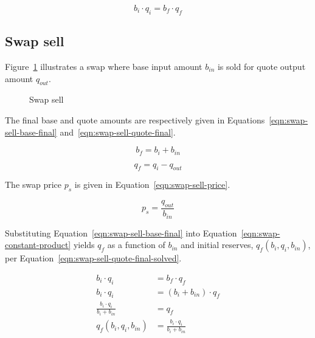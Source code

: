 \documentclass[table, twocolumn]{article}
\begin{document}
\begin{equation}\label{eqn:swap-constant-product}
	b_i \cdot q_i = b_f \cdot q_f
\end{equation}

\subsection{Swap sell}\label{ssec:swap-sell}

Figure~\ref{fig:swap-sell} illustrates a swap where base input amount $b_{in}$ is sold
for quote output amount $q_{out}$.

\begin{figure}[!htb]
	\centering
	
	\caption{Swap sell}\label{fig:swap-sell}
\end{figure}

The final base and quote amounts are respectively given in
Equations~\ref{eqn:swap-sell-base-final} and~\ref{eqn:swap-sell-quote-final}.

\begin{equation}\label{eqn:swap-sell-base-final}
	b_f = b_i + b_{in}
\end{equation}

\begin{equation}\label{eqn:swap-sell-quote-final}
	q_f = q_i - q_{out}
\end{equation}

The swap price $p_s$ is given in Equation~\ref{eqn:swap-sell-price}.

\begin{equation}\label{eqn:swap-sell-price}
	p_s = \frac{q_{out}}{b_{in}}
\end{equation}

Substituting Equation~\ref{eqn:swap-sell-base-final} into
Equation~\ref{eqn:swap-constant-product} yields $q_f$ as a function of $b_{in}$ and
initial reserves, $q_f(b_i, q_i, b_{in})$, per
Equation~\ref{eqn:swap-sell-quote-final-solved}.

\begin{align}\label{eqn:swap-sell-quote-final-solved}
	b_i \cdot q_i                      & = b_f \cdot q_f \nonumber            \\
	b_i \cdot q_i                      & = (b_i + b_{in}) \cdot q_f \nonumber \\
	\frac{b_i \cdot q_i}{b_i + b_{in}} & = q_f \nonumber                      \\
	q_f(b_i, q_i, b_{in})              & = \frac{b_i \cdot q_i}{b_i + b_{in}}
\end{align}
\end{document}
